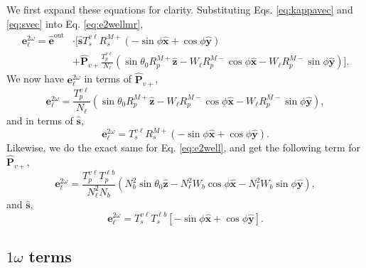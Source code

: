 We first expand these equations for clarity. Substituting Eqs.
\eqref{eq:kappavec} and \eqref{eq:svec} into Eq. \eqref{eq:e2wellmr},
\begin{equation*}\label{eq:e2wexpmr}
\begin{split}
\mathbf{e}^{2\omega}_{\ell} = \hat{\mathbf{e}}^{\mathrm{out}}&\cdot
\Bigg[
\hat{\mathbf{s}}T_{s}^{v\ell}R^{M+}_{s}
\left(
- \sin\phi\hat{\mathbf{x}}
+ \cos\phi\hat{\mathbf{y}}
\right)\\
&+ \hat{\mathbf{P}}_{v+}\frac{T^{v\ell}_{p}}{N_{\ell}}
\left(
  \sin\theta_{0}R^{M+}_{p}\hat{\mathbf{z}}
- W_{\ell}R^{M-}_{p}\cos\phi\hat{\mathbf{x}}
- W_{\ell}R^{M-}_{p}\sin\phi\hat{\mathbf{y}}
\right)
\Bigg].
\end{split}
\end{equation*}
We now have $\mathbf{e}^{2\omega}_{\ell}$ in terms of
$\hat{\mathbf{P}}_{v+}$,
\begin{equation}\label{eq:e2wpmr}
\mathbf{e}^{2\omega}_{\ell} =
\frac{T^{v\ell}_{p}}{N_{\ell}}
\left(
  \sin\theta_{0}R^{M+}_{p}\hat{\mathbf{z}}
- W_{\ell}R^{M-}_{p}\cos\phi\hat{\mathbf{x}}
- W_{\ell}R^{M-}_{p}\sin\phi\hat{\mathbf{y}}
\right),
\end{equation}
and in terms of $\hat{\mathbf{s}}$,
\begin{equation}\label{eq:e2wsmr}
\mathbf{e}^{2\omega}_{\ell} =
T_{s}^{v\ell}R^{M+}_{s}
\left(
- \sin\phi\hat{\mathbf{x}}
+ \cos\phi\hat{\mathbf{y}}
\right).
\end{equation}
Likewise, we do the exact same for Eq. \eqref{eq:e2well}, and get the
following term for $\hat{\mathbf{P}}_{v+}$,
\begin{equation}\label{eq:e2wp}
\mathbf{e}^{2\omega}_{\ell} =
\frac{T^{v\ell}_{p}T^{\ell b}_{p}}
     {N^{2}_{\ell}N_{b}}
\left(
  N^{2}_{b}\sin\theta_{0}\hat{\mathbf{z}}
- N^{2}_{\ell}W_{b}\cos\phi\hat{\mathbf{x}}
- N^{2}_{\ell}W_{b}\sin\phi\hat{\mathbf{y}}
\right),
\end{equation}
and $\hat{\mathbf{s}}$,
\begin{equation}\label{eq:e2ws}
\mathbf{e}^{2\omega}_{\ell} 
= T^{v\ell}_{s}T^{\ell b}_{s}
\left[-\sin\phi\hat{\mathbf{x}} + \cos\phi\hat{\mathbf{y}}\right].
\end{equation}


\subsection{\texorpdfstring{$1\omega$}{1w} terms}

